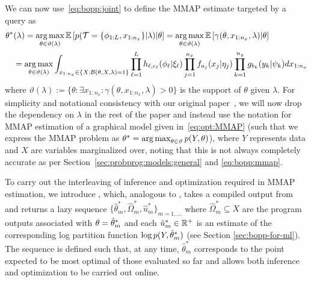 We can now use~\eqref{eq:bopp:joint} to define the MMAP estimate targeted by a  query as
\begin{align}
\label{eq:bopp:mmap}
\begin{split}
\theta^*& (\lambda) = \operatorname*{arg\,max}_{\theta \in \vartheta (\lambda)} 
\mathbb{E} \left[p(\mathcal{T} = \{\phi_{1:L},x_{1:n_x}\} | \lambda) \middle| \theta \right]
= \operatorname*{arg\,max}_{\theta \in \vartheta (\lambda)} 
\mathbb{E} \left[\gamma(\theta,x_{1:n_x}, \lambda) \middle| \theta \right] \\
& = \operatorname*{arg\,max}_{\theta \in \vartheta (\lambda)} 
\int_{x_{1:n_x} \in \{X : \mathcal{B}(\theta,X,\lambda)=1\}} 
\prod_{\ell=1}^{L} h_{\ell,c_{\ell}} (\phi_{\ell} | \xi_{\ell})
\prod_{j=1}^{n_x} f_{a_j}(x_j | \eta_j) \prod_{k=1}^{n_y} g_{b_k}(y_k | \psi_k) dx_{1:n_x}
\end{split}
\end{align}
where $\vartheta (\lambda) := \{\theta : \exists x_{1:n_x} : \gamma(\theta,x_{1:n_x},\lambda)>0\}$
is the support of $\theta$ given $\lambda$.  
For simplicity and notational consistency with our original paper~\citep{rainforth2016nips}, 
we will now drop the dependency on $\lambda$ in the rest of the paper and instead
use the notation for MMAP estimation of a graphical model given in~\eqref{eq:opt:MMAP}
(such that we express the MMAP problem as $\theta^* = \operatorname*{arg\,max}_{\theta \in \vartheta}
p(Y,\theta)$),
where $Y$ represents data and $X$ are variables marginalized over, noting that this
is not always completely accurate as per Section~\ref{sec:probprog:models:general} and 
\eqref{eq:bopp:mmap}.

To carry out the interleaving of inference and optimization required in MMAP estimation, we
introduce \doopt, which, analogous to \doquery, takes a compiled output from  and
returns a lazy sequence $\{\hat{\theta}^*_m,\hat{\Omega}^*_m,\hat{u}^*_m\}_{m=1,\dots}$
where $\hat{\Omega}^*_m \subseteq X$ are the program outputs associated with
$\theta=\hat{\theta}^*_m$ and each $\hat{u}^*_m \in \mathbb{R}^+$ is an estimate of the corresponding
log partition function $\log p(Y, \hat{\theta}_m^*)$ (see Section \ref{sec:bopp-for-ml}).  The
sequence is
defined such that, at any time, $\hat{\theta}^*_m$ corresponds to the point expected to be
most optimal of those evaluated so far and allows both inference and optimization to be
carried out online.
